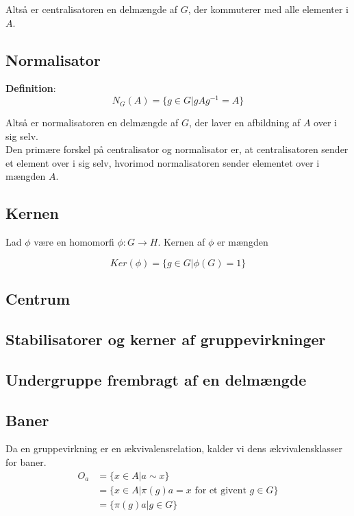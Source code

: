 \documentclass[11pt]{article}
\begin{document}
Altså er centralisatoren en delmængde af $G$, der kommuterer med alle elementer i $A$.\\

\subsection*{Normalisator}
\textbf{Definition}:\\
$$N_G(A) = \{ g \in G | gAg^{-1} = A\}$$

Altså er normalisatoren en delmængde af $G$, der laver en afbildning af $A$ over i sig selv.\\

Den primære forskel på centralisator og normalisator er, at centralisatoren sender et element over i sig selv, hvorimod normalisatoren sender elementet over i mængden $A$.




\subsection*{Kernen}
Lad $\phi$ være en homomorfi $\phi : G \to H$. Kernen af $\phi$ er mængden

$$Ker(\phi) = \{ g \in G | \phi(G) = 1 \}$$

\subsection*{Centrum}


\subsection*{Stabilisatorer og kerner af gruppevirkninger}


\subsection*{Undergruppe frembragt af en delmængde}


\subsection*{Baner}
Da en gruppevirkning er en ækvivalensrelation, kalder vi dens ækvivalensklasser for baner.\\
\begin{align*}
  O_a &= \{ x \in A | a \sim x \}\\
  &= \{ x \in A | \pi(g)a = x \text{ for et givent } g \in G \}\\
  &= \{ \pi(g)a | g \in G \}
\end{align*}
\end{document}
